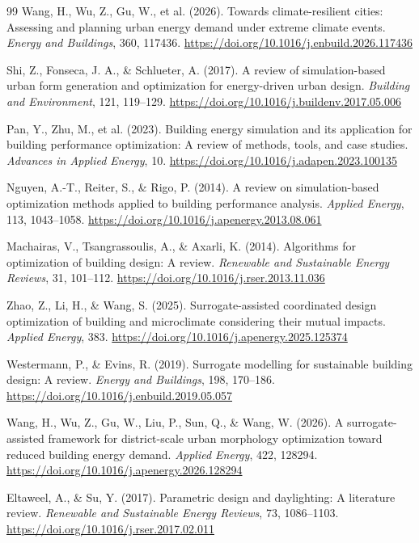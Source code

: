 \begin{thebibliography}{99}
Wang, H., Wu, Z., Gu, W., et al. (2026). Towards climate-resilient cities: Assessing and planning urban energy demand under extreme climate events. \textit{Energy and Buildings}, 360, 117436. \url{https://doi.org/10.1016/j.enbuild.2026.117436}

Shi, Z., Fonseca, J. A., \& Schlueter, A. (2017). A review of simulation-based urban form generation and optimization for energy-driven urban design. \textit{Building and Environment}, 121, 119--129. \url{https://doi.org/10.1016/j.buildenv.2017.05.006}

Pan, Y., Zhu, M., et al. (2023). Building energy simulation and its application for building performance optimization: A review of methods, tools, and case studies. \textit{Advances in Applied Energy}, 10. \url{https://doi.org/10.1016/j.adapen.2023.100135}

Nguyen, A.-T., Reiter, S., \& Rigo, P. (2014). A review on simulation-based optimization methods applied to building performance analysis. \textit{Applied Energy}, 113, 1043--1058. \url{https://doi.org/10.1016/j.apenergy.2013.08.061}

Machairas, V., Tsangrassoulis, A., \& Axarli, K. (2014). Algorithms for optimization of building design: A review. \textit{Renewable and Sustainable Energy Reviews}, 31, 101--112. \url{https://doi.org/10.1016/j.rser.2013.11.036}

Zhao, Z., Li, H., \& Wang, S. (2025). Surrogate-assisted coordinated design optimization of building and microclimate considering their mutual impacts. \textit{Applied Energy}, 383. \url{https://doi.org/10.1016/j.apenergy.2025.125374}

Westermann, P., \& Evins, R. (2019). Surrogate modelling for sustainable building design: A review. \textit{Energy and Buildings}, 198, 170--186. \url{https://doi.org/10.1016/j.enbuild.2019.05.057}

Wang, H., Wu, Z., Gu, W., Liu, P., Sun, Q., \& Wang, W. (2026). A surrogate-assisted framework for district-scale urban morphology optimization toward reduced building energy demand. \textit{Applied Energy}, 422, 128294. \url{https://doi.org/10.1016/j.apenergy.2026.128294}

Eltaweel, A., \& Su, Y. (2017). Parametric design and daylighting: A literature review. \textit{Renewable and Sustainable Energy Reviews}, 73, 1086--1103. \url{https://doi.org/10.1016/j.rser.2017.02.011}


\end{thebibliography}
